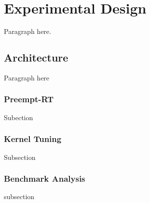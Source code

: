 \chapter{Experimental Design}
\label{sec:experimental_design}

Paragraph here.

\section{Architecture}
\label{sec:expt_arch}
Paragraph here


\subsection{Preempt-RT}
Subection

\subsection{Kernel Tuning}
Subsection 

\subsection{Benchmark Analysis}
subsection








